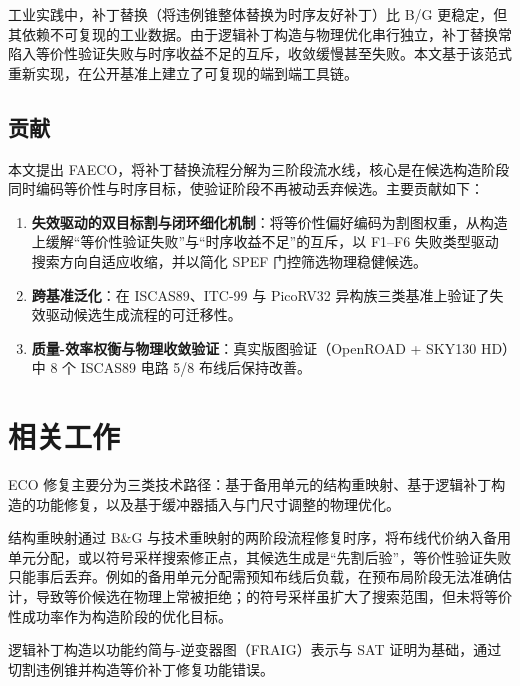 \documentclass[journal]{IEEEtran}
\begin{document}
工业实践中，补丁替换（将违例锥整体替换为时序友好补丁）比 B/G 更稳定，但其依赖不可复现的工业数据。由于逻辑补丁构造与物理优化串行独立，补丁替换常陷入等价性验证失败与时序收益不足的互斥，收敛缓慢甚至失败。本文基于该范式重新实现，在公开基准上建立了可复现的端到端工具链。

\subsection{贡献}

本文提出 FAECO，将补丁替换流程分解为三阶段流水线，核心是在候选构造阶段同时编码等价性与时序目标，使验证阶段不再被动丢弃候选。主要贡献如下：

\begin{enumerate}
  \item \textbf{失效驱动的双目标割与闭环细化机制}：将等价性偏好编码为割图权重，从构造上缓解“等价性验证失败”与“时序收益不足”的互斥，以 F1--F6 失败类型驱动搜索方向自适应收缩，并以简化 SPEF 门控筛选物理稳健候选。
  \item \textbf{跨基准泛化}：在 ISCAS89、ITC-99 与 PicoRV32 异构族三类基准上验证了失效驱动候选生成流程的可迁移性。
  \item \textbf{质量-效率权衡与物理收敛验证}：真实版图验证（OpenROAD + SKY130 HD）中 8 个 ISCAS89 电路 5/8 布线后保持改善。
\end{enumerate}

\section{相关工作}

ECO 修复主要分为三类技术路径：基于备用单元的结构重映射、基于逻辑补丁构造的功能修复，以及基于缓冲器插入与门尺寸调整的物理优化。

结构重映射通过 B\&G 与技术重映射的两阶段流程修复时序，将布线代价纳入备用单元分配\cite{ho2010eco,ho2012treco}，或以符号采样搜索修正点\cite{kravets2019symbolic}，其候选生成是“先割后验”，等价性验证失败只能事后丢弃。例如\cite{ho2010eco}的备用单元分配需预知布线后负载，在预布局阶段无法准确估计，导致等价候选在物理上常被拒绝；\cite{kravets2019symbolic}的符号采样虽扩大了搜索范围，但未将等价性成功率作为构造阶段的优化目标。

逻辑补丁构造以功能约简与-逆变器图（FRAIG）表示与 SAT 证明为基础，通过切割违例锥并构造等价补丁修复功能错误\cite{jiang2010fraig,jiang2016resource}。
\end{document}
